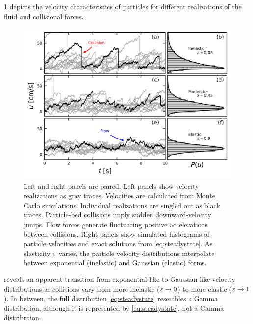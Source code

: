\DIFdelbegin {}\DIFdelend \DIFaddbegin {}\DIFaddend \ref{fig:fig2} depicts the velocity characteristics of particles for different realizations of the fluid and collisional forces.
\begin{figure}
	\centerline{\includegraphics{./figures/ch5/Fig2pdfs.png}}
	\caption{Left and right panels are paired. Left panels show velocity realizations as gray traces. Velocities are calculated from Monte Carlo simulations. Individual realizations are singled out as black traces. Particle-bed collisions imply sudden downward-velocity jumps. Flow forces generate fluctuating positive accelerations between collisions. Right panels show simulated histograms of particle velocities and exact solutions from \DIFdelbeginFL {}\DIFdelendFL \DIFaddbeginFL {}\DIFaddendFL \ref{eq:steadystate}. As \DIFaddbeginFL {}\DIFaddendFL elasticity $\varepsilon$ varies, the particle velocity distributions interpolate between exponential (inelastic) and Gaussian (elastic) forms.}
	\label{fig:fig2}
\end{figure}
\DIFdelbegin {}\DIFdelend \DIFaddbegin {}\DIFaddend reveals an apparent transition from exponential-like to Gaussian-like velocity distributions as collisions vary from more inelastic ($\varepsilon \rightarrow 0$) to more elastic ($\varepsilon \rightarrow 1$). In between, the full distribution \DIFaddbegin {}\DIFaddend \ref{eq:steadystate} resembles a Gamma distribution, although it is represented by \DIFdelbegin {}\DIFdelend \DIFaddbegin {}\DIFaddend \ref{eq:steadystate}, not a Gamma distribution.


